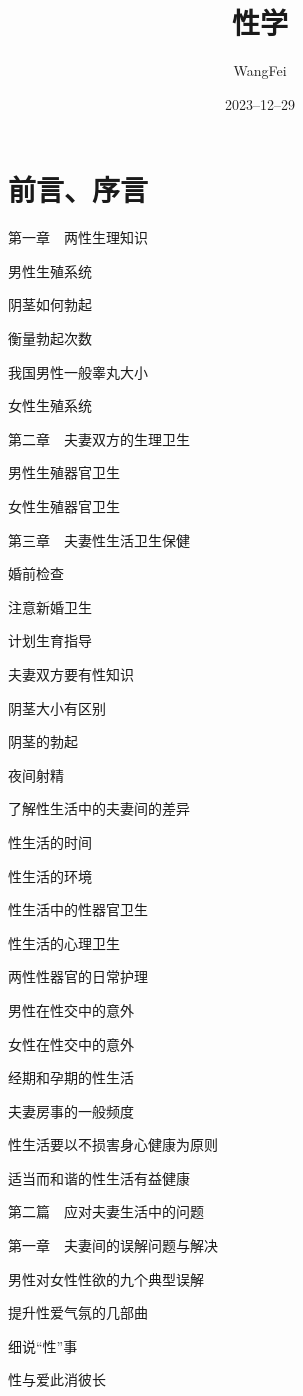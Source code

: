 \documentclass[12pt,UTF8]{ctexbook}
\title{\heiti\zihao{0} 性学}
\author{WangFei}
\date{2023--12--29}
\begin{document}
\maketitle
\tableofcontents

\frontmatter
\chapter{前言、序言}

\mainmatter

第一章　两性生理知识

男性生殖系统

阴茎如何勃起

衡量勃起次数

我国男性一般睾丸大小

女性生殖系统

第二章　夫妻双方的生理卫生

男性生殖器官卫生

女性生殖器官卫生

第三章　夫妻性生活卫生保健

婚前检查

注意新婚卫生

计划生育指导

夫妻双方要有性知识

阴茎大小有区别

阴茎的勃起

夜间射精

了解性生活中的夫妻间的差异

性生活的时间

性生活的环境

性生活中的性器官卫生

性生活的心理卫生

两性性器官的日常护理

男性在性交中的意外

女性在性交中的意外

经期和孕期的性生活

夫妻房事的一般频度

性生活要以不损害身心健康为原则

适当而和谐的性生活有益健康

第二篇　应对夫妻生活中的问题

第一章　夫妻间的误解问题与解决

男性对女性性欲的九个典型误解

提升性爱气氛的几部曲

细说“性”事

性与爱此消彼长
\end{document}
